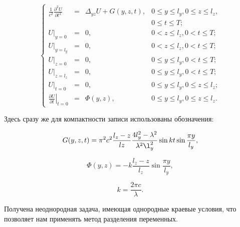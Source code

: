 \begin{equation}
  \label{eq:new_problem}
  \left\{
    \begin{array}{rclr}
      \frac{1}{c^2} \frac{\partial^2 U}{\partial t^2} & = & \Delta_{yz} U + G(y, z, t), & 0 \le y \le l_y, 0 \le z \le l_z, \\
      &&& 0 \le t \le T;\\
      \left. U \right|_{y=0} & = & 0, & 0 < z \le l_z, 0 < t \le T; \\
      \left. U \right|_{y=l_y} & = & 0, & 0 < z \le l_z, 0 < t \le T; \\ 
      \left. U \right|_{z=0} & = &  0, & 0 \le y \le l_y, 0 < t \le T; \\
      \left. U \right|_{z=l_z} &=& 0, & 0 \le y \le l_y, 0 < t \le T; \\
      \left. U \right|_{t=0} & = & 0, & 0 \le y \le l_y, 0 \le z \le l_z; \\
      \left. \frac{\partial U}{\partial t} \right|_{t=0} &=& \Phi(y, z), & 0 \le y \le l_y, 0 \le z \le l_z.
    \end{array}
  \right.
\end{equation}

Здесь сразу же для компактности записи использованы обозначения:

\begin{equation}
\label{eq:g}
G(y, z, t) = \pi^2 c^2\frac{l_z - z}{lz}\frac{4l_y^2 - \lambda^2}{\lambda^2 \l_y^2}\sin k t \sin\frac{\pi y}{l_y},
\end{equation}

\begin{equation}
\label{eq:phi}
\Phi(y, z) = -k\frac{l_z - z}{l_z}\sin\frac{\pi y}{l_y},
\end{equation}

\begin{equation}
\label{eq:k}
k = \frac{2 \pi c}{\lambda}.
\end{equation}


Получена неоднородная задача, имеющая однородные краевые условия, что
позволяет нам применять метод разделения переменных.
